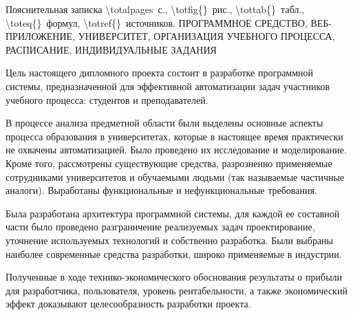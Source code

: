 \thispagestyle{empty}


\begin{center}
	Пояснительная записка \num{\totalpages}~с., \num{\totfig{}}~рис., \num{\tottab{}}~табл., \num{\toteq{}}~формул, \num{\totref{}}~источников.
	\MakeUppercase{Программное средство, веб-приложение, университет, организация учебного процесса, расписание, индивидуальные задания}
\end{center}

Цель настоящего дипломного проекта состоит в разработке программной системы, предназначенной для эффективной автоматизации задач участников учебного процесса: студентов и преподавателей. 

В процессе анализа предметной области были выделены основные аспекты процесса образования в университетах, которые в настоящее время практически не охвачены автоматизацией. Было проведено их исследование и моделирование. Кроме того, рассмотрены существующие средства, разрозненно применяемые сотрудниками университетов и обучаемыми людьми (так называемые частичные аналоги). Выработаны функциональные и нефункциональные требования.

Была разработана архитектура программной системы, для каждой ее составной части было проведено разграничение реализуемых задач проектирование, уточнение используемых технологий и собственно разработка. Были выбраны наиболее современные средства разработки, широко применяемые в индустрии. 

Полученные в ходе технико-экономического обоснования результаты о прибыли для разработчика, пользователя, уровень рентабельности, а также экономический эффект доказывают целесообразность разработки про\-екта.

